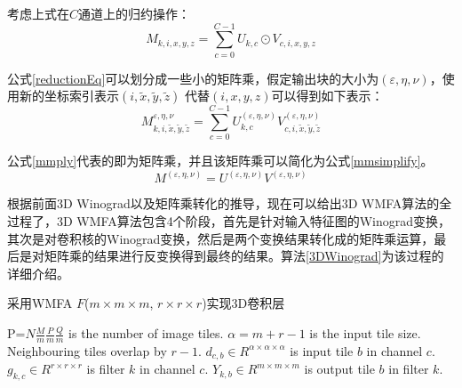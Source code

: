 考虑上式在$C$通道上的归约操作：
\begin{equation}
\label{reductionEq}
M_{k,i,x,y,z} = \sum_{c=0}^{C-1}U_{k,c}\odot V_{c,i,x,y,z}
\end{equation} 

公式\ref{reductionEq}可以划分成一些小的矩阵乘，假定输出块的大小为$(\varepsilon,\eta,\nu)$，使用新的坐标索引表示$(i,\tilde{x},\tilde{y},\tilde{z})$ 代替$(i,x,y,z)$可以得到如下表示：
\begin{equation}
\label{mmply}
M_{k,i,\tilde{x},\tilde{y},\tilde{z}}^{\varepsilon,\eta,\nu} = \sum_{c=0}^{C-1}U_{k,c}^{(\varepsilon,\eta,\nu)}V_{c,i,\tilde{x},\tilde{y},\tilde{z}}^{(\varepsilon,\eta,\nu)}
\end{equation} 

公式\ref{mmply}代表的即为矩阵乘，并且该矩阵乘可以简化为公式\ref{mmsimplify}。
\begin{equation}
\label{mmsimplify}
M^{(\varepsilon,\eta,\nu)} = U^{(\varepsilon,\eta,\nu)}V^{(\varepsilon,\eta,\nu)}
\end{equation}

根据前面3D Winograd以及矩阵乘转化的推导，现在可以给出3D WMFA算法的全过程了，3D WMFA算法包含4个阶段，首先是针对输入特征图的Winograd变换，其次是对卷积核的Winograd变换，然后是两个变换结果转化成的矩阵乘运算，最后是对矩阵乘的结果进行反变换得到最终的结果。算法\ref{3DWinograd}为该过程的详细介绍。
\begin{algorithm}
\caption{采用WMFA $F$($m \times m \times m$, $r \times r \times r$)实现3D卷积层}
 \label{3DWinograd}
\begin{algorithmic} 
\STATE P=$N{\frac{M}{m}}{\frac{P}{m}}{\frac{Q}{m}}$ is the number of image tiles.
\STATE $\alpha = m+r-1$ is the input tile size.
\STATE Neighbouring tiles overlap by $r-1$.
\STATE $d_{c,b}\in \!R^{\alpha\times\alpha\times\alpha}$ is input tile $b$ in channel $c$.
\STATE $g_{k,c}\in \!R^{r\times r \times r}$ is filter $k$ in channel $c$.
\STATE $Y_{k,b}\in \!R^{m\times m \times m}$ is output tile $b$ in filter $k$.
  \ENDFOR
\ENDFOR

  \ENDFOR
\ENDFOR

    \ENDFOR 
  \ENDFOR
\ENDFOR

  \ENDFOR
\ENDFOR
\end{algorithmic}
\end{algorithm}


